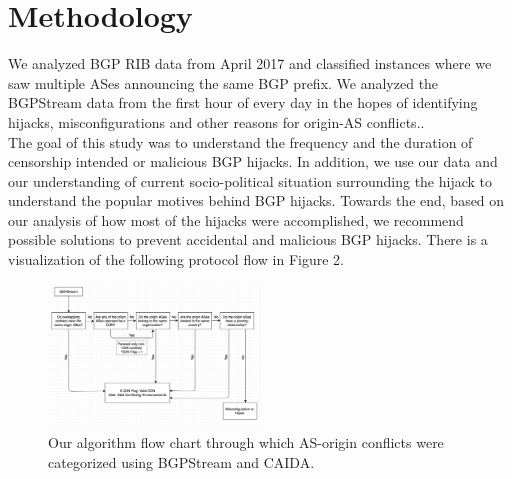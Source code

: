  \section{Methodology}\label{sec:methodology}
We analyzed BGP RIB data from April 2017 and classified instances where we saw multiple ASes announcing the same BGP prefix. We analyzed the BGPStream data from the first hour of every day in the hopes of identifying hijacks, misconfigurations and other reasons for origin-AS conflicts.. \\
The goal of this study was to understand the frequency and the duration of censorship intended or malicious BGP hijacks. In addition, we  use our data and our understanding of current socio-political situation surrounding the hijack to understand the popular motives behind BGP hijacks. Towards the end, based on our analysis of how most of the hijacks were accomplished, we recommend possible solutions to prevent accidental and malicious BGP hijacks. There is a visualization of the following protocol flow in Figure 2.

 \begin{figure}[!htbp]
	\includegraphics[width=0.5\textwidth]{flow.png}
	\caption{Our algorithm flow chart through which AS-origin conflicts were categorized using BGPStream and CAIDA.}
	\label{a:label}
\end{figure}

